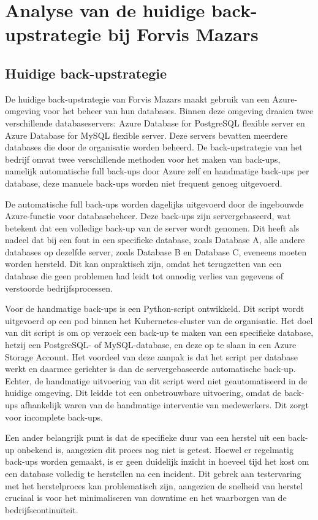 \chapter{Analyse van de huidige back-upstrategie bij Forvis Mazars}
\label{ch:analys}
\section{Huidige back-upstrategie}
De huidige back-upstrategie van Forvis Mazars maakt gebruik van een Azure-omgeving voor het beheer van hun databases. Binnen deze omgeving draaien twee verschillende databaseservers: Azure Database for PostgreSQL flexible server en Azure Database for MySQL flexible server. Deze servers bevatten meerdere databases die door de organisatie worden beheerd. De back-upstrategie van het bedrijf omvat twee verschillende methoden voor het maken van back-ups, namelijk automatische full back-ups door Azure zelf en handmatige back-ups per database, deze manuele back-ups worden niet frequent genoeg uitgevoerd.

De automatische full back-ups worden dagelijks uitgevoerd door de ingebouwde Azure-functie voor databasebeheer. Deze back-ups zijn servergebaseerd, wat betekent dat een volledige back-up van de server wordt genomen. Dit heeft als nadeel dat bij een fout in een specifieke database, zoals Database A, alle andere databases op dezelfde server, zoals Database B en Database C, eveneens moeten worden hersteld. Dit kan onpraktisch zijn, omdat het terugzetten van een database die geen problemen had leidt tot onnodig verlies van gegevens of verstoorde bedrijfsprocessen.

Voor de handmatige back-ups is een Python-script ontwikkeld. Dit script wordt uitgevoerd op een pod binnen het Kubernetes-cluster van de organisatie. Het doel van dit script is om op verzoek een back-up te maken van een specifieke database, hetzij een PostgreSQL- of MySQL-database, en deze op te slaan in een Azure Storage Account. Het voordeel van deze aanpak is dat het script per database werkt en daarmee gerichter is dan de servergebaseerde automatische back-up. Echter, de handmatige uitvoering van dit script werd niet geautomatiseerd in de huidige omgeving. Dit leidde tot een onbetrouwbare uitvoering, omdat de back-ups afhankelijk waren van de handmatige interventie van medewerkers. Dit zorgt voor incomplete back-ups.

Een ander belangrijk punt is dat de specifieke duur van een herstel uit een back-up onbekend is, aangezien dit proces nog niet is getest. Hoewel er regelmatig back-ups worden gemaakt, is er geen duidelijk inzicht in hoeveel tijd het kost om een database volledig te herstellen na een incident. Dit gebrek aan testervaring met het herstelproces kan problematisch zijn, aangezien de snelheid van herstel cruciaal is voor het minimaliseren van downtime en het waarborgen van de bedrijfscontinuïteit.

